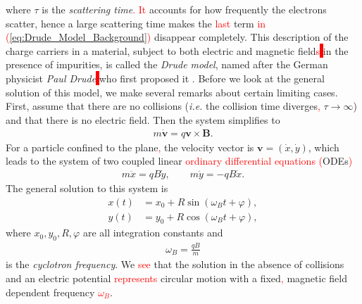         where $\tau$ is the \textit{scattering time}\textcolor{red}{. It} accounts for how frequently the electrons scatter, hence a large scattering time makes the \textcolor{red}{last} term \textcolor{red}{in (\ref{eq:Drude_Model_Background})} disappear completely. This description of the charge carriers in a material, subject to both electric and magnetic field\textcolor{red}{s}\colorbox{red}{ } in the presence of impurities, is called the \textit{Drude model}, named after the German physicist \textit{Paul Drude}\colorbox{red}{ }  who first proposed it \cite{Drude1900a, Drude1900b}. Before we look at the general solution of this model, we make several remarks about certain limiting cases.\\
        \indent First, assume that there are no collisions (\textit{i.e.} the collision time diverges\textcolor{red}{,} $\tau \rightarrow\infty$) and that there is no electric field. Then the system simplifies to
        \begin{align}
            m\dot{\bm{v}} =q \bm{v}\times \bm{B}.
        \end{align}
        For a particle confined to the plane\textcolor{red}{,} the velocity vector is $\bm{v} = (\dot{x}, \dot{y})$, which leads to the system of two coupled linear \textcolor{red}{ordinary differential equations (}ODEs\textcolor{red}{)}
        \begin{align}
            m \ddot{x} = q B \dot{y}, \qquad m \ddot{y}= -q B \dot{x}.
        \end{align}
        The general solution to this system is
        \begin{align}
            x(t) &= x_0 + R \sin\left(\omega_Bt + \varphi \right), \\
            y(t) &= y_0 + R \cos\left(\omega_Bt + \varphi \right),
        \end{align}
        where $x_0, y_0, R, \varphi$ are all integration constants and
        \begin{align}
            \omega_B = \frac{q B}{m}
        \end{align}
        is the \textit{cyclotron frequency}.
        We \textcolor{red}{see} that the solution in the absence of collisions and an electric potential \textcolor{red}{represents} circular motion with a fixed\textcolor{red}{,} magnetic field dependent frequency \textcolor{red}{$\omega_B$}.

